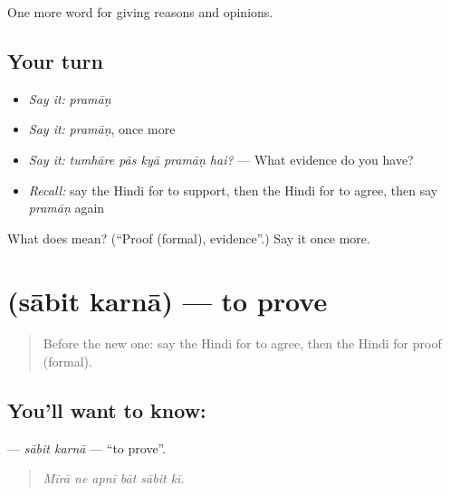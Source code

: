 \begin{grammarlens}[title={What you've built}]
One more word for giving reasons and opinions.
\end{grammarlens}

\subsection*{Your turn}
\begin{itemize}
\raggedright
  \item \emph{Say it:} \emph{pramāṇ}
  \item \emph{Say it:} \emph{pramāṇ}, once more
  \item \emph{Say it:} \emph{tumhāre pās kyā pramāṇ hai?} — What evidence do you have?
  \item \emph{Recall:} say the Hindi for to support, then the Hindi for to agree, then say \emph{pramāṇ} again
\end{itemize}

\begin{tcolorbox}[breakable,colback=teal!4,colframe=teal!35!black,title={Before you move on}]
What does  mean? (\textquotedblleft{}Proof (formal), evidence\textquotedblright{}.) Say it once more.
\end{tcolorbox}
\section[\texorpdfstring{\hi{साबित} \hi{करना} (sābit karnā)}{साबित करना (sābit karnā)}]{  (sābit karnā) — to prove}

\label{lesson:HI-C348-sabitkarna}



\begin{quote}
Before the new one: say the Hindi for to agree, then the Hindi for proof (formal).
\end{quote}

\subsection*{You'll want to know:  }
\textbf{ } — \emph{sābit karnā} — \textquotedblleft{}to prove\textquotedblright{}.

\begin{quote}
     
\end{quote}

\begin{quote}
\emph{Mīrā ne apnī bāt sābit kī.}
\end{quote}


